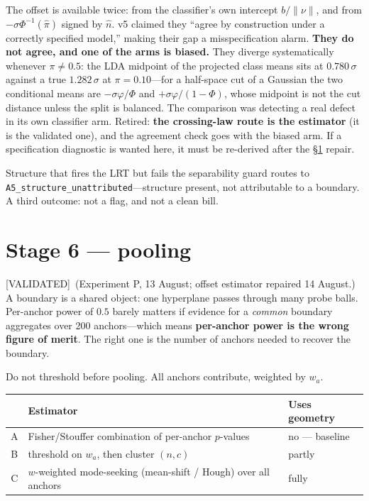 \documentclass[11pt]{article}
\newcommand{\pihat}{\hat{\pi}}
\newcommand{\nhat}{\hat{n}}
\newcommand{\provtag}[2]{{\footnotesize\sffamily\textcolor{#1}{[#2]}}}
\newcommand{\VALID}{\provtag{okgreen}{VALIDATED}}
\begin{document}
The offset is available twice: from the classifier's own intercept $b/\lVert\nu\rVert$, and from
$-\sigma\Phi^{-1}(\pihat)$ signed by $\nhat$. v5 claimed they ``agree by construction under a
correctly specified model,'' making their gap a misspecification alarm. \textbf{They do not
agree, and one of the arms is biased.} They diverge systematically whenever $\pi \ne 0.5$: the
LDA midpoint of the projected class means sits at $0.780\,\sigma$ against a true $1.282\,\sigma$
at $\pi = 0.10$---for a half-space cut of a Gaussian the two conditional means are
$-\sigma\varphi/\Phi$ and $+\sigma\varphi/(1-\Phi)$, whose midpoint is not the cut distance
unless the split is balanced. The comparison was detecting a real defect in its own classifier
arm. Retired: \textbf{the crossing-law route is the estimator} (it is the validated one), and
the agreement check goes with the biased arm. If a specification diagnostic is wanted here, it
must be re-derived after the \S\ref{sec:stage6} repair.

\medskip
\noindent Structure that fires the LRT but fails the separability guard routes to
\texttt{A5\_structure\_unattributed}---structure present, not attributable to a boundary. A
third outcome: not a flag, and not a clean bill.

\section{Stage 6 --- pooling}
\label{sec:stage6}

\VALID\ (Experiment P, 13 August; offset estimator repaired 14 August.) A boundary is a shared
object: one hyperplane passes through many probe balls. Per-anchor power of $0.5$ barely matters
if evidence for a \emph{common} boundary aggregates over 200 anchors---which means
\textbf{per-anchor power is the wrong figure of merit}. The right one is the number of anchors
needed to recover the boundary.

Do not threshold before pooling. All anchors contribute, weighted by $w_a$.

\begin{table}[h]
\small\centering
\begin{tabular}{@{}cp{}p{}@{}}
\toprule
& \textbf{\sffamily Estimator} & \textbf{\sffamily Uses geometry}\\
\midrule
A & Fisher/Stouffer combination of per-anchor $p$-values & no --- baseline\\
B & threshold on $w_a$, then cluster $(n,c)$ & partly\\
C & $w$-weighted mode-seeking (mean-shift / Hough) over all anchors & fully\\
\bottomrule
\end{tabular}
\end{table}
\end{document}
